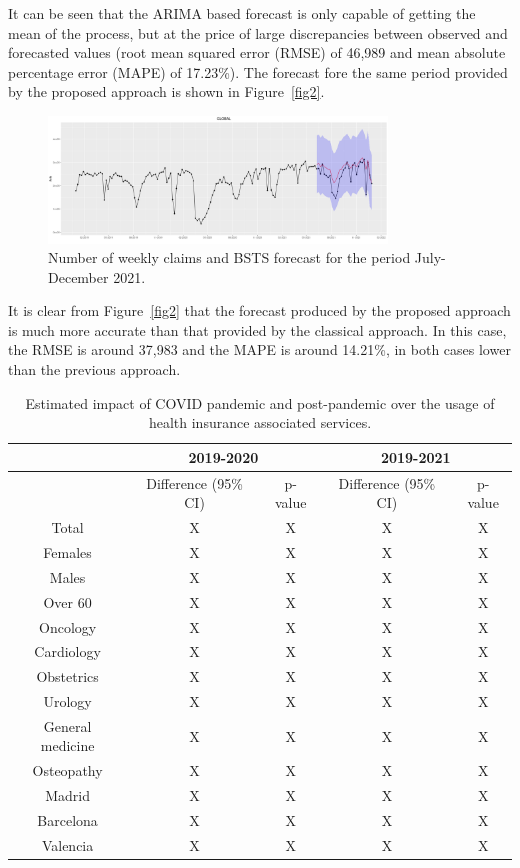 \documentclass[12pt]{article}
\theoremstyle{definition}
\theoremstyle{remark}
\begin{document}
It can be seen that the ARIMA based forecast is only capable of getting the mean of the process, but at the price of large discrepancies between observed and forecasted values (root mean squared error (RMSE) of 46,989 and mean absolute percentage error (MAPE) of 17.23\%). The forecast fore the same period provided by the proposed approach is shown in Figure~\ref{fig2}.

\begin{center}
  \begin{figure}[H]
    \includegraphics[width=9cm]{Results/bsts_global_prediction.png}\caption{Number of weekly claims and BSTS forecast for the period July-December 2021.}
  \end{figure}\label{fig2}
\end{center}

It is clear from Figure~\ref{fig2} that the forecast produced by the proposed approach is much more accurate than that provided by the classical approach. In this case, the RMSE is around 37,983 and the MAPE is around 14.21\%, in both cases lower than the previous approach. 

\begin{table}[H]\caption{Estimated impact of COVID pandemic and post-pandemic over the usage of health insurance associated services.}
  \centering  
  \begin{tabular}{ccc|cc}
    \hline
    & \multicolumn{2}{c|}{2019-2020} & \multicolumn{2}{c}{2019-2021} \\
    \hline
    & Difference (95\% CI) & p-value & Difference (95\% CI) & p-value\\
    \hline
    Total & X & X & X & X\\
    \hline
    Females & X & X & X & X\\
    Males & X & X & X & X\\
    \hline
    Over 60 & X & X & X & X\\
    \hline
    Oncology & X & X & X & X\\
    Cardiology & X & X & X & X\\
    Obstetrics & X & X & X & X\\
    Urology & X & X & X & X\\
    General medicine & X & X & X & X\\
    Osteopathy & X & X & X & X\\
    \hline
    Madrid & X & X & X & X\\
    Barcelona & X & X & X & X\\
    Valencia & X & X & X & X\\
    \hline
\end{tabular}
\end{table}
\end{document}
